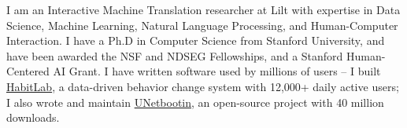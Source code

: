 \documentclass[10pt,A4]{article}
\newcommand{\cvsection}[1]
{
	\begin{center}
		\large\textcolor{sectcol}{\textbf{#1}}
	\end{center}
}
\begin{document}
\normalsize






I am an \textcolor{sectcol}{Interactive Machine Translation} researcher at Lilt with expertise in \textcolor{sectcol}{Data Science}, \textcolor{sectcol}{Machine Learning}, \textcolor{sectcol}{Natural Language Processing}, and \textcolor{sectcol}{Human-Computer Interaction}. I have a Ph.D in Computer Science from Stanford University, and have been awarded the NSF and NDSEG Fellowships, and a Stanford Human-Centered AI Grant. I have written software used by millions of users -- I built \hypersetup{urlcolor=black}\href{https://habitlab.github.io}{HabitLab}\hypersetup{urlcolor=linkcol}, a data-driven behavior change system with \textcolor{sectcol}{12,000+ daily active users}; I also wrote and maintain \hypersetup{urlcolor=black}\href{https://unetbootin.github.io}{UNetbootin}\hypersetup{urlcolor=linkcol}, an open-source project with \textcolor{sectcol}{40 million downloads}.\\

\end{document}
